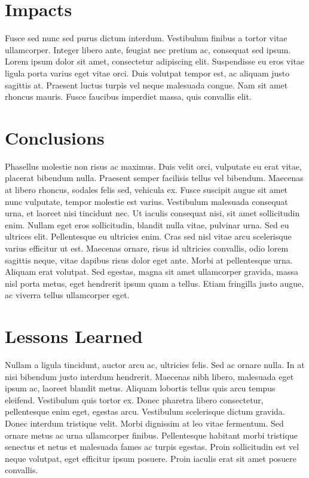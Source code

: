 \section{Impacts}
Fusce sed nunc sed purus dictum interdum. Vestibulum finibus a tortor vitae ullamcorper. Integer libero ante, feugiat nec pretium ac, consequat sed ipsum. Lorem ipsum dolor sit amet, consectetur adipiscing elit. Suspendisse eu eros vitae ligula porta varius eget vitae orci. Duis volutpat tempor est, ac aliquam justo sagittis at. Praesent luctus turpis vel neque malesuada congue. Nam sit amet rhoncus mauris. Fusce faucibus imperdiet massa, quis convallis elit.

\section{Conclusions}
Phasellus molestie non risus ac maximus. Duis velit orci, vulputate eu erat vitae, placerat bibendum nulla. Praesent semper facilisis tellus vel bibendum. Maecenas at libero rhoncus, sodales felis sed, vehicula ex. Fusce suscipit augue sit amet nunc vulputate, tempor molestie est varius. Vestibulum malesuada consequat urna, et laoreet nisi tincidunt nec. Ut iaculis consequat nisi, sit amet sollicitudin enim. Nullam eget eros sollicitudin, blandit nulla vitae, pulvinar urna. Sed eu ultrices elit. Pellentesque eu ultricies enim. Cras sed nisl vitae arcu scelerisque varius efficitur ut est. Maecenas ornare, risus id ultricies convallis, odio lorem sagittis neque, vitae dapibus risus dolor eget ante. Morbi at pellentesque urna. Aliquam erat volutpat. Sed egestas, magna sit amet ullamcorper gravida, massa nisl porta metus, eget hendrerit ipsum quam a tellus. Etiam fringilla justo augue, ac viverra tellus ullamcorper eget.

\section{Lessons Learned}
Nullam a ligula tincidunt, auctor arcu ac, ultricies felis. Sed ac ornare nulla. In at nisi bibendum justo interdum hendrerit. Maecenas nibh libero, malesuada eget ipsum ac, laoreet blandit metus. Aliquam lobortis tellus quis arcu tempus eleifend. Vestibulum quis tortor ex. Donec pharetra libero consectetur, pellentesque enim eget, egestas arcu. Vestibulum scelerisque dictum gravida. Donec interdum tristique velit. Morbi dignissim at leo vitae fermentum. Sed ornare metus ac urna ullamcorper finibus. Pellentesque habitant morbi tristique senectus et netus et malesuada fames ac turpis egestas. Proin sollicitudin est vel neque volutpat, eget efficitur ipsum posuere. Proin iaculis erat sit amet posuere convallis.

